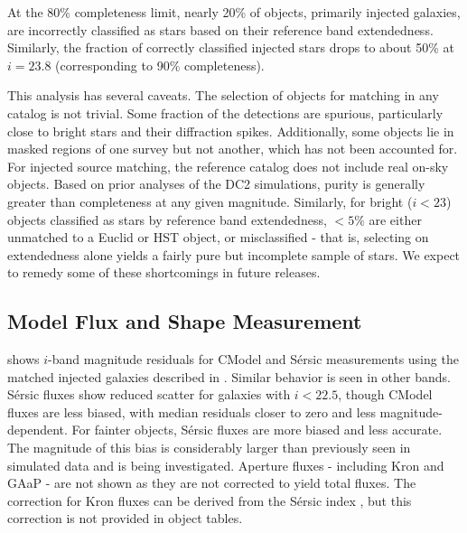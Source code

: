 At the 80\% completeness limit, nearly 20\% of objects, primarily injected galaxies, are incorrectly classified as stars based on their reference band extendedness.
Similarly, the fraction of correctly classified injected stars drops to about 50\% at $i=23.8$ (corresponding to 90\% completeness).

This analysis has several caveats.
The selection of objects for matching in any catalog is not trivial.
Some fraction of the detections are spurious, particularly close to bright stars and their diffraction spikes.
Additionally, some objects lie in masked regions of one survey but not another, which has not been accounted for. 
For injected source matching, the reference catalog does not include real on-sky objects.
Based on prior analyses of the \gls{DC2} simulations, purity is generally greater than completeness at any given magnitude.
Similarly, for bright ($i<23$) objects classified as stars by reference band extendedness, $<5\%$ are either unmatched to a Euclid or HST object, or misclassified - that is, selecting on extendedness alone yields a fairly pure but incomplete sample of stars.
We expect to remedy some of these shortcomings in future releases.

\subsection{Model Flux and Shape Measurement}
\label{ssec:fluxes}

 shows $i$-band magnitude residuals for CModel and S\'ersic measurements using the matched injected galaxies described in .
Similar behavior is seen in other bands.
S\'ersic fluxes show reduced scatter for galaxies with $i<22.5$, though CModel fluxes are less biased, with median residuals closer to zero and less magnitude-dependent.
For fainter objects, S\'ersic fluxes are more biased and less accurate.
The magnitude of this bias is considerably larger than previously seen in simulated data and is being investigated.
Aperture fluxes - including Kron and \gls{GAaP} - are not shown as they are not corrected to yield total fluxes.
The correction for Kron fluxes can be derived from the S\'ersic index \citep{2005PASA...22..118G}, but this correction is not provided in object tables.

